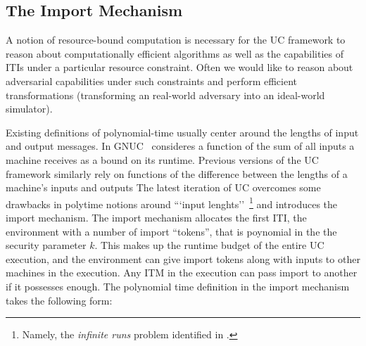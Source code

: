 

\subsection{The Import Mechanism}
A notion of resource-bound computation is necessary for the UC framework to reason about computationally efficient algorithms as well as the capabilities of ITIs under a particular resource constraint.
Often we would like to reason about adversarial capabilities under such constraints and perform efficient transformations (transforming an real-world adversary into an ideal-world simulator).


Existing definitions of polynomial-time usually center around the lengths of input and output messages. In GNUC~\cite{gnuc} consideres a function of the sum of all inputs a machine receives as a bound on its runtime. Previous versions of the UC framework similarly rely on functions of the difference between the lengths of a machine's inputs and outputs
The latest iteration of UC overcomes some drawbacks in polytime notions around ```input lenghts''~\footnote{Namely, the \emph{infinite runs} problem identified in \cite{uc}.} and introduces the import mechanism.
The import mechanism allocates the first ITI, the environment with a number of import ``tokens'', that is poynomial in the the security parameter $k$. 
This makes up the runtime budget of the entire UC execution, and the environment can give import tokens along with inputs to other machines in the execution. Any ITM in the execution can pass import to another if it possesses enough.
The polynomial time definition in the import mechanism takes the following form:

